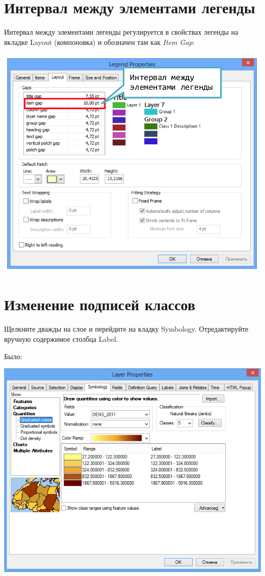 \documentclass[12pt,]{book}
\begin{document}
\hypertarget{section-60}{%
\section{Интервал между элементами легенды}\label{section-60}}

Интервал между элементами легенды регулируется в свойствах легенды на вкладке Layout (компоновка) и обозначен там как \emph{Item Gap}:

\includegraphics{images/Appendix/image61.png}

\hypertarget{section-61}{%
\section{Изменение подписей классов}\label{section-61}}

Щелкните дважды на слое и перейдите на кладку Symbology. Отредактируйте вручную содержимое столбца Label.

Было:

\includegraphics{images/Appendix/image62.png}
\end{document}
